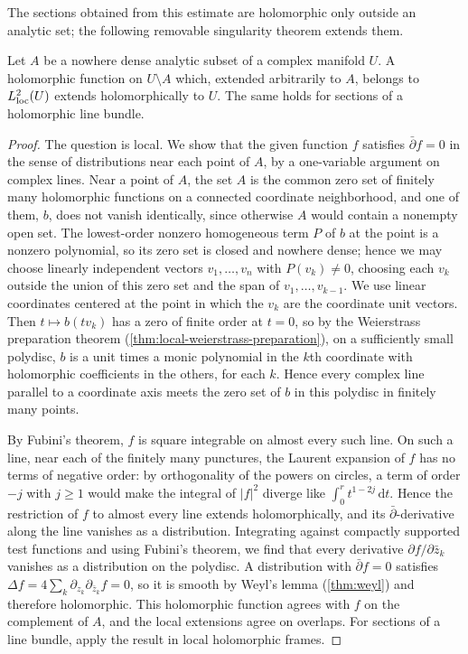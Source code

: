 The sections obtained from this estimate are holomorphic only outside an analytic set; the following removable singularity theorem extends them.

\begin{lemma}\label{lem:l2-holomorphic-analytic-removal}
Let $A$ be a nowhere dense analytic subset of a complex manifold $U$. A holomorphic function on $U\setminus A$ which, extended arbitrarily to $A$, belongs to $L^2_{\mathrm{loc}}(U)$ extends holomorphically to $U$. The same holds for sections of a holomorphic line bundle.
\end{lemma}
\begin{proof}
The question is local. We show that the given function $f$ satisfies $\bar\partial f=0$ in the sense of distributions near each point of $A$, by a one-variable argument on complex lines. Near a point of $A$, the set $A$ is the common zero set of finitely many holomorphic functions on a connected coordinate neighborhood, and one of them, $b$, does not vanish identically, since otherwise $A$ would contain a nonempty open set. The lowest-order nonzero homogeneous term $P$ of $b$ at the point is a nonzero polynomial, so its zero set is closed and nowhere dense; hence we may choose linearly independent vectors $v_1,\ldots,v_n$ with $P(v_k)\neq0$, choosing each $v_k$ outside the union of this zero set and the span of $v_1,\ldots,v_{k-1}$. We use linear coordinates centered at the point in which the $v_k$ are the coordinate unit vectors. Then $t\mapsto b(tv_k)$ has a zero of finite order at $t=0$, so by the Weierstrass preparation theorem (\cref{thm:local-weierstrass-preparation}), on a sufficiently small polydisc, $b$ is a unit times a monic polynomial in the $k$th coordinate with holomorphic coefficients in the others, for each $k$. Hence every complex line parallel to a coordinate axis meets the zero set of $b$ in this polydisc in finitely many points.

By Fubini's theorem, $f$ is square integrable on almost every such line. On such a line, near each of the finitely many punctures, the Laurent expansion of $f$ has no terms of negative order: by orthogonality of the powers on circles, a term of order $-j$ with $j\geq1$ would make the integral of $|f|^2$ diverge like $\int_0^rt^{1-2j}\,\mathrm dt$. Hence the restriction of $f$ to almost every line extends holomorphically, and its $\bar\partial$-derivative along the line vanishes as a distribution. Integrating against compactly supported test functions and using Fubini's theorem, we find that every derivative $\partial f/\partial\bar z_k$ vanishes as a distribution on the polydisc. A distribution with $\bar\partial f=0$ satisfies $\Delta f=4\sum_k\partial_{z_k}\partial_{\bar z_k}f=0$, so it is smooth by Weyl's lemma (\cref{thm:weyl}) and therefore holomorphic. This holomorphic function agrees with $f$ on the complement of $A$, and the local extensions agree on overlaps. For sections of a line bundle, apply the result in local holomorphic frames.
\end{proof}

